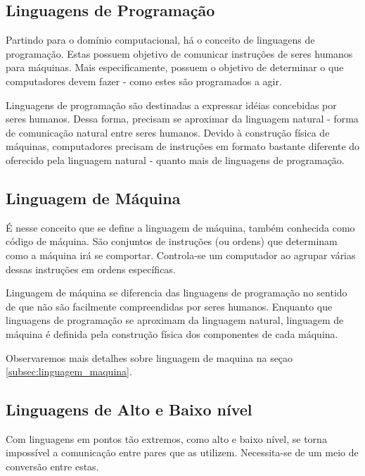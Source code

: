 \subsection{Linguagens de Programação}

Partindo para o domínio computacional, há o conceito de linguagens de
programação. Estas possuem objetivo de comunicar instruções de seres humanos
para máquinas. Mais especificamente, possuem o objetivo de determinar o que
computadores devem fazer - como estes são programados a agir.

Linguagens de programação são destinadas a expressar idéias concebidas por seres
humanos. Dessa forma, precisam se aproximar da linguagem natural - forma de
comunicação natural entre seres humanos.  Devido à construção física de
máquinas, computadores precisam de instruções em formato bastante diferente do
oferecido pela linguagem natural - quanto mais de linguagens de programação.

\subsection{Linguagem de Máquina}

É nesse conceito que se define a linguagem de máquina, também conhecida como
código de máquina. São conjuntos de instruções (ou ordens) que determinam como a
máquina irá se comportar. Controla-se um computador ao agrupar várias dessas
instruções em ordens específicas.

Linguagem de máquina se diferencia das linguagens de programação no sentido de
que não são facilmente compreendidas por seres humanos. Enquanto que linguagens
de programação se aproximam da linguagem natural, linguagem de máquina é
definida pela construção física dos componentes de cada máquina.

Observaremos mais detalhes sobre linguagem de maquina na seçao
\ref{subsec:linguagem_maquina}.

\subsection{Linguagens de Alto e Baixo nível}

Com linguagens em pontos tão extremos, como alto e baixo nível, se torna
impossível a comunicação entre pares que as utilizem. Necessita-se de um meio de
conversão entre estas.

